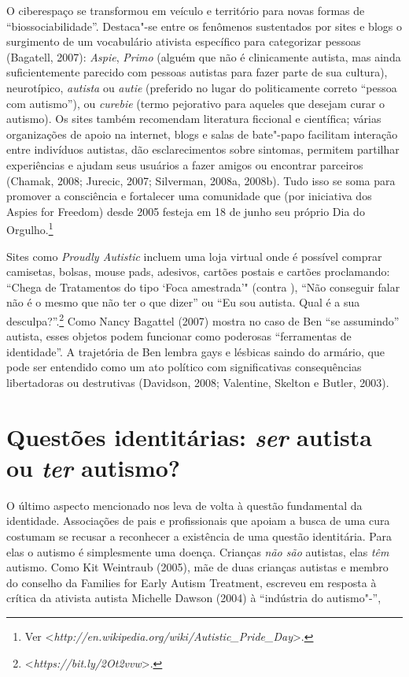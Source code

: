 O ciberespaço se transformou em veículo e território para novas formas
de ``biossociabilidade''. Destaca"-se entre os fenômenos sustentados por
sites e blogs o surgimento de um vocabulário ativista específico para
categorizar pessoas (Bagatell, 2007): \emph{Aspie}, \emph{Primo} (alguém
que não é clinicamente autista, mas ainda suficientemente parecido com
pessoas autistas para fazer parte de sua cultura), neurotípico,
\emph{autista} ou \emph{autie} (preferido no lugar do politicamente
correto ``pessoa com autismo''), ou \emph{curebie} (termo pejorativo
para aqueles que desejam curar o autismo). Os sites também recomendam
literatura ficcional e científica; várias organizações de apoio na
internet, blogs e salas de bate"-papo facilitam interação entre
indivíduos autistas, dão esclarecimentos sobre sintomas, permitem
partilhar experiências e ajudam seus usuários a fazer amigos ou
encontrar parceiros (Chamak, 2008; Jurecic, 2007; Silverman, 2008a,
2008b). Tudo isso se soma para promover a consciência e fortalecer uma
comunidade que (por iniciativa dos Aspies for Freedom) desde 2005
festeja em 18 de junho seu próprio Dia do Orgulho.\footnote[18]{Ver \textless{}\emph{http://en.wikipedia.org/wiki/Autistic\_Pride\_Day}\textgreater{}.}

Sites como \emph{Proudly Autistic} incluem uma loja virtual onde é possível
comprar camisetas, bolsas, mouse pads, adesivos, cartões postais e
cartões proclamando: ``Chega de Tratamentos do tipo `Foca amestrada'"
(contra ), ``Não conseguir falar não é o mesmo que não ter o que
dizer'' ou ``Eu sou autista. Qual é a sua
desculpa?''.\footnote[19]{\textless{}\emph{https://bit.ly/2Ot2vvw}\textgreater{}.} Como Nancy Bagattel (2007) mostra no
caso de Ben ``se assumindo'' autista, esses objetos podem funcionar como
poderosas ``ferramentas de identidade''. A trajetória de Ben lembra gays
e lésbicas saindo do armário, que pode ser entendido como um ato
político com significativas consequências libertadoras ou destrutivas
(Davidson, 2008; Valentine, Skelton e Butler, 2003).

\section{Questões identitárias: \emph{ser} autista ou \emph{ter} autismo?}

O último aspecto mencionado nos leva de volta à questão fundamental da
identidade. Associações de pais e profissionais que apoiam a busca de
uma cura costumam se recusar a reconhecer a existência de uma questão
identitária. Para elas o autismo é simplesmente uma doença. Crianças
\emph{não são} autistas, elas \emph{têm} autismo. Como Kit Weintraub
(2005), mãe de duas crianças autistas e membro do conselho da Families
for Early Autism Treatment, escreveu em resposta à crítica da ativista
autista Michelle Dawson (2004) à ``indústria do autismo"-'',

